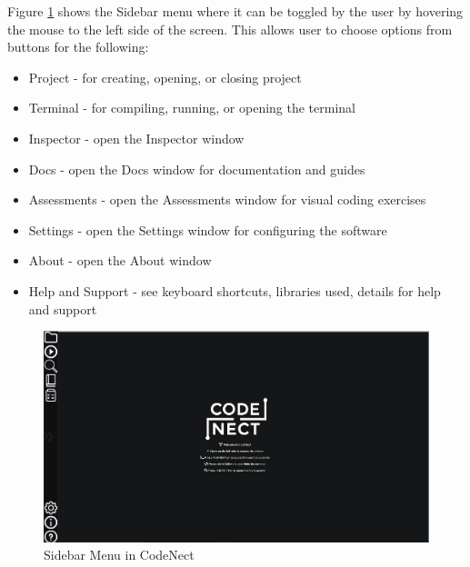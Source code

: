 \parx
Figure \ref{fig:cn_sidebar} shows the Sidebar menu where it can be toggled by the user
by hovering the mouse to the left side of the screen. This allows user to choose
options from buttons for the following:

\begin{itemize}
	\item Project - for creating, opening, or closing project
	\item Terminal - for compiling, running, or opening the terminal
	\item Inspector - open the Inspector window
	\item Docs - open the Docs window for documentation and guides
	\item Assessments - open the Assessments window for visual coding exercises
	\item Settings - open the Settings window for configuring the software
	\item About - open the About window
	\item Help and Support - see keyboard shortcuts, libraries used, details
	for help and support
\end{itemize}

\begin{figure}[H]
	\centering
	\captionsetup{justification=centering}
	\captionsetup[figure]{list=yes}
	\includegraphics[width=\linewidth]{media/sc_sidebar.png}
	\caption[Sidebar Menu in CodeNect]{Sidebar Menu in CodeNect}
	\label{fig:cn_sidebar}
\end{figure}

